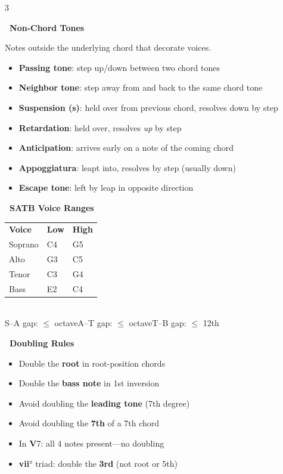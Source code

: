 \documentclass[letterpaper]{article}
\newcommand{\rn}[2]{\textbf{#1}#2}
\newcommand{\sect}[2]{%
  \noindent\begin{minipage}{\linewidth}%
  \colorbox{headerbg}{\color{white}\textbf{\ #1\ }}\par
  \vspace{1mm}
  #2
  \end{minipage}\par\vspace{2.5mm}%
}
\begin{document}
\begin{multicols}{3}
\sect{Non-Chord Tones}{%
Notes outside the underlying chord that decorate voices.
\begin{itemize}
  \item \textbf{Passing tone}: step up/down between two chord tones
  \item \textbf{Neighbor tone}: step away from and back to the same chord tone
  \item \textbf{Suspension (s)}: held over from previous chord, resolves down by step
  \item \textbf{Retardation}: held over, resolves \textit{up} by step
  \item \textbf{Anticipation}: arrives early on a note of the coming chord
  \item \textbf{Appoggiatura}: leapt into, resolves by step (usually down)
  \item \textbf{Escape tone}: left by leap in opposite direction
\end{itemize}%
}

\sect{SATB Voice Ranges}{%
\begin{tabular}{@{}lll@{}}
\textbf{Voice} & \textbf{Low} & \textbf{High} \\
Soprano & C4 & G5 \\
Alto    & G3 & C5 \\
Tenor   & C3 & G4 \\
Bass    & E2 & C4 \\
\end{tabular}\\[0.5mm]
S--A gap: \(\leq\) octave\quad A--T gap: \(\leq\) octave\quad T--B gap: \(\leq\) 12th%
}

\sect{Doubling Rules}{%
\begin{itemize}
  \item Double the \textbf{root} in root-position chords
  \item Double the \textbf{bass note} in 1st inversion
  \item Avoid doubling the \textbf{leading tone} (7th degree)
  \item Avoid doubling the \textbf{7th} of a 7th chord
  \item In \rn{V}{7}: all 4 notes present---no doubling
  \item \rn{vii}{°} triad: double the \textbf{3rd} (not root or 5th)
\end{itemize}%
}


\end{multicols}
\end{document}

